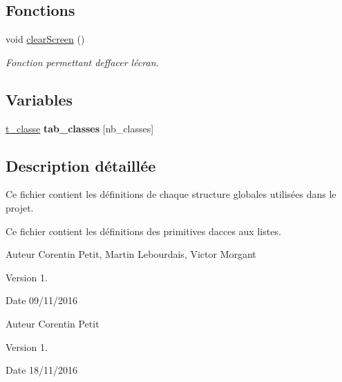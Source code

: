 \subsection*{Fonctions}
\begin{DoxyCompactItemize}
\item 
void \hyperlink{a00021_a3eed6cf0481bf3462f6c5169e1b257f7}{clear\+Screen} ()\hypertarget{a00021_a3eed6cf0481bf3462f6c5169e1b257f7}{}\label{a00021_a3eed6cf0481bf3462f6c5169e1b257f7}

\begin{DoxyCompactList}\small\item\em Fonction permettant d\textquotesingle{}effacer l\textquotesingle{}écran. \end{DoxyCompactList}\end{DoxyCompactItemize}
\subsection*{Variables}
\begin{DoxyCompactItemize}
\item 
\hyperlink{a00004}{t\+\_\+classe} {\bfseries tab\+\_\+classes} \mbox{[}nb\+\_\+classes\mbox{]}\hypertarget{a00021_a61d1d67ae5f5040aa12b0bcc9d0e39f8}{}\label{a00021_a61d1d67ae5f5040aa12b0bcc9d0e39f8}

\end{DoxyCompactItemize}


\subsection{Description détaillée}
Ce fichier contient les définitions de chaque structure globales utilisées dans le projet. 

Ce fichier contient les définitions des primitives d\textquotesingle{}acces aux listes.

\begin{DoxyAuthor}{Auteur}
Corentin Petit, Martin Lebourdais, Victor Morgant 
\end{DoxyAuthor}
\begin{DoxyVersion}{Version}
1. 
\end{DoxyVersion}
\begin{DoxyDate}{Date}
09/11/2016
\end{DoxyDate}
\begin{DoxyAuthor}{Auteur}
Corentin Petit 
\end{DoxyAuthor}
\begin{DoxyVersion}{Version}
1. 
\end{DoxyVersion}
\begin{DoxyDate}{Date}
18/11/2016 
\end{DoxyDate}
